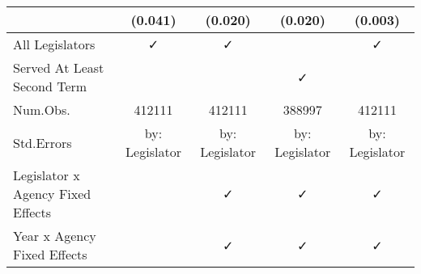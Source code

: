 \begin{table}
\begin{tabular}[t]{lcccc}
 & (\num{0.041}) & (\num{0.020}) & (\num{0.020}) & (\num{0.003})\\
\midrule
All Legislators & ✓ & ✓ &  & ✓\\
Served At Least Second Term &  &  & ✓ & \\
Num.Obs. & \num{412111} & \num{412111} & \num{388997} & \num{412111}\\
Std.Errors & by: Legislator & by: Legislator & by: Legislator & by: Legislator\\
Legislator x Agency Fixed Effects &  & ✓ & ✓ & ✓\\
Year x Agency Fixed Effects &  & ✓ & ✓ & ✓\\
\bottomrule
\end{tabular}
\end{table}
